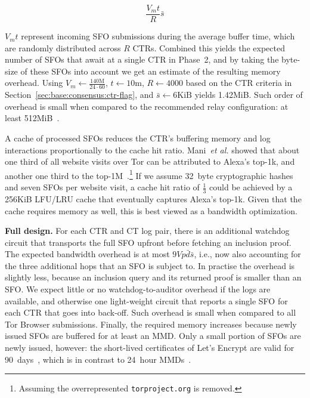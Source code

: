 \begin{equation} \label{eq:memory}
	\frac{V_mt}{R} \bar{s}
\end{equation}

$V_mt$ represent incoming SFO submissions during the average buffer time, which
are randomly distributed across $R$ CTRs.  Combined this yields the expected
number of SFOs that await at a single CTR in Phase~2, and by taking the
byte-size of these SFOs into account we get an estimate of the resulting memory
overhead.  Using
	$V_m \gets \frac{140\textrm{M}}{24\cdot60}$,
	$t \gets 10$m,
	$R \gets 4000$ based on the CTR criteria in
		Section~\ref{sec:base:consensus:ctr-flag}, and
	$\bar{s} \gets 6\textrm{KiB}$
yields 1.42MiB.  Such order of overhead is small when compared to the
recommended relay configuration:
	at least 512MiB~\cite{relay-config}.

A cache of processed SFOs reduces the CTR's buffering memory and log
interactions proportionally to the cache hit ratio.  Mani~\emph{et al.} showed
that about one third of all website visits over Tor can be attributed to Alexa's
top-1k, and another one third to the top-1M~\cite{mani}.\footnote{%
	Assuming the overrepresented
	\texttt{torproject.org} is removed.
} If we assume 32~byte cryptographic hashes and seven SFOs per website visit,
a cache hit ratio of $\frac{1}{3}$ could be achieved by a 256KiB LFU/LRU cache
that eventually captures Alexa's top-1k.  Given that the cache requires
memory as well, this is best viewed as a bandwidth optimization.

\textbf{Full design.}
For each CTR and CT log pair, there is an additional watchdog circuit that
transports the full SFO upfront before fetching an inclusion proof.  The
expected bandwidth overhead is at most $9Vp\bar{d}\bar{s}$, i.e., now
also accounting for the three additional hops that an SFO is subject to.  In
practise the overhead is slightly less, because an inclusion query and its
returned proof is smaller than an SFO.  We expect little or no
watchdog-to-auditor overhead if the logs are available, and otherwise one
light-weight circuit that reports a single SFO for each CTR that goes into
back-off.  Such overhead is small when compared to all Tor Browser submissions.
Finally, the required memory increases because newly issued SFOs are buffered
for at least an MMD.  Only a small portion of SFOs are newly issued, however:
	the short-lived certificates of Let's Encrypt are valid for
	90~days~\cite{le}, which is in contrast to 24~hour
	MMDs~\cite{google-log-policy}.

